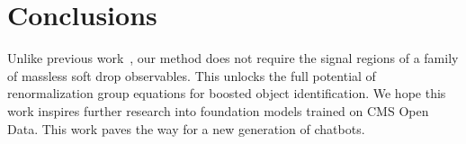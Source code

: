 \section{Conclusions}\label{sec:conclusions}

Unlike previous
work~\cite{TPC:1775-Soft-Drop-Observables-Are-Secretly-Attention-Mechanisms-September-26-2026},
our method does not require the signal regions of a family of massless
soft drop observables. This unlocks the full potential of
renormalization group equations for boosted object identification. We
hope this work inspires further research into foundation models trained
on CMS Open Data. This work paves the way for a new generation of
chatbots.

